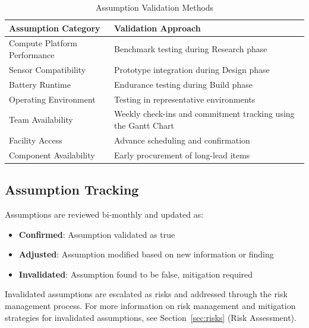\begin{table}[H]
\centering
\caption{Assumption Validation Methods}
\label{tab:assumption_validation}
\begin{tabular}{@{}p{}p{}@{}}
\toprule
\textbf{Assumption Category} & \textbf{Validation Approach} \\
\midrule
Compute Platform Performance & Benchmark testing during Research phase \\
Sensor Compatibility & Prototype integration during Design phase \\
Battery Runtime & Endurance testing during Build phase \\
Operating Environment & Testing in representative environments \\
Team Availability & Weekly check-ins and commitment tracking using the Gantt Chart \\
Facility Access & Advance scheduling and confirmation \\
Component Availability & Early procurement of long-lead items \\
\bottomrule
\end{tabular}
\end{table}

\subsection{Assumption Tracking}

Assumptions are reviewed bi-monthly and updated as:

\begin{itemize}
    \item \textbf{Confirmed}: Assumption validated as true
    \item \textbf{Adjusted}: Assumption modified based on new information or finding
    \item \textbf{Invalidated}: Assumption found to be false, mitigation required
\end{itemize}

Invalidated assumptions are escalated as risks and addressed through the risk management process. For more information on risk management and mitigation strategies for invalidated assumptions, see Section~\ref{sec:risks} (Risk Assessment).
